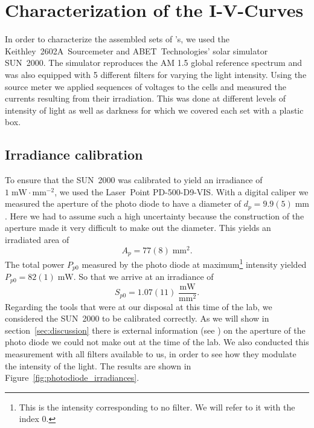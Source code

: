 
\section{Characterization of the I-V-Curves}\label{sec:charac}

In order to characterize the assembled sets of \BHSC's, we used the Keithley~2602A~Sourcemeter and ABET~Technologies’ solar simulator SUN~2000. The simulator reproduces the AM 1.5 global reference spectrum and was also equipped with 5 different filters for varying the light intensity. Using the source meter we applied sequences of voltages to the cells and measured the currents resulting from their irradiation. This was done at different levels of intensity of light as well as darkness for which we covered each set with a plastic box.
\subsection{Irradiance calibration}
To ensure that the SUN~2000 was calibrated to yield an irradiance of $1\;\text{mW}\!\cdot\text{mm}^{-2}$, we used the Laser~Point PD-500-D9-VIS. With a digital caliper we measured the aperture of the photo diode to have a diameter of $d_p = 9.9(5)\;\text{mm}$. Here we had to assume such a high uncertainty because the construction of the aperture made it very difficult to make out the diameter. This yields an irradiated area of
\begin{equation*}
A_p =  77(8)\;\text{mm}^2.
\end{equation*}
The total power $P_{p0}$ measured by the photo diode at maximum\footnote{This is the intensity corresponding to no filter. We will refer to it with the index 0.} intensity yielded $P_{p0} = 82(1)\;\text{mW}$. So that we arrive at an irradiance of
\begin{equation*}
S_{p0} = 1.07(11)\;\frac{\text{mW}}{\text{mm}^2}.
\end{equation*}
Regarding the tools that were at our disposal at this time of the lab, we considered the SUN~2000 to be calibrated correctly. As we will show in section~\ref{sec:discussion} there is external information (see \cite{photodiode}) on the aperture of the photo diode we could not make out at the time of the lab.\mypar
We also conducted this measurement with all filters available to us, in order to see how they modulate the intensity of the light. The results are shown in Figure~\ref{fig:photodiode_irradiances}.

